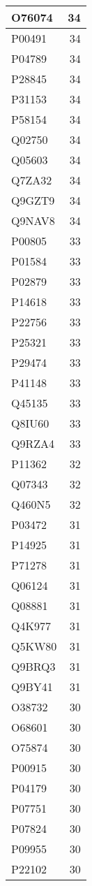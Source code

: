 \documentclass[
]{book}
\theoremstyle{definition}
\theoremstyle{definition}
\theoremstyle{definition}
\theoremstyle{definition}
\theoremstyle{remark}
\begin{document}
\begin{table}
\begin{tabular}{l|r}
\hline
O76074 & 34\\
\hline
P00491 & 34\\
\hline
P04789 & 34\\
\hline
P28845 & 34\\
\hline
P31153 & 34\\
\hline
P58154 & 34\\
\hline
Q02750 & 34\\
\hline
Q05603 & 34\\
\hline
Q7ZA32 & 34\\
\hline
Q9GZT9 & 34\\
\hline
Q9NAV8 & 34\\
\hline
P00805 & 33\\
\hline
P01584 & 33\\
\hline
P02879 & 33\\
\hline
P14618 & 33\\
\hline
P22756 & 33\\
\hline
P25321 & 33\\
\hline
P29474 & 33\\
\hline
P41148 & 33\\
\hline
Q45135 & 33\\
\hline
Q8IU60 & 33\\
\hline
Q9RZA4 & 33\\
\hline
P11362 & 32\\
\hline
Q07343 & 32\\
\hline
Q460N5 & 32\\
\hline
P03472 & 31\\
\hline
P14925 & 31\\
\hline
P71278 & 31\\
\hline
Q06124 & 31\\
\hline
Q08881 & 31\\
\hline
Q4K977 & 31\\
\hline
Q5KW80 & 31\\
\hline
Q9BRQ3 & 31\\
\hline
Q9BY41 & 31\\
\hline
O38732 & 30\\
\hline
O68601 & 30\\
\hline
O75874 & 30\\
\hline
P00915 & 30\\
\hline
P04179 & 30\\
\hline
P07751 & 30\\
\hline
P07824 & 30\\
\hline
P09955 & 30\\
\hline
P22102 & 30\\

\end{tabular}
\end{table}
\end{document}
